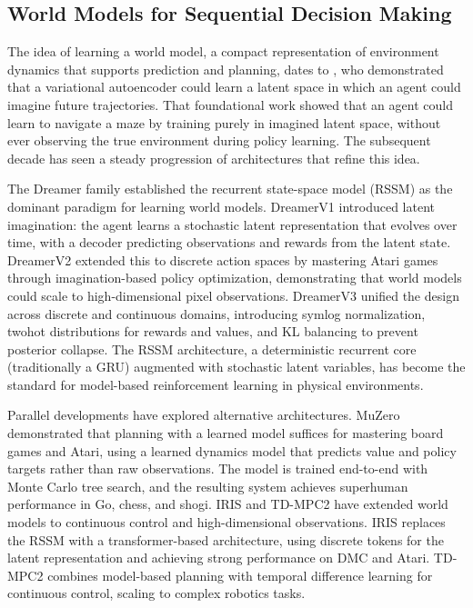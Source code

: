 \subsection{World Models for Sequential Decision Making}

The idea of learning a world model, a compact representation of environment dynamics that supports prediction and planning, dates to \citet{ha2018worldmodels}, who demonstrated that a variational autoencoder could learn a latent space in which an agent could imagine future trajectories. That foundational work showed that an agent could learn to navigate a maze by training purely in imagined latent space, without ever observing the true environment during policy learning. The subsequent decade has seen a steady progression of architectures that refine this idea.

The Dreamer family \citep{hafner2020dreamerv1, hafner2021dreamerv2, hafner2023dreamerv3} established the recurrent state-space model (RSSM) as the dominant paradigm for learning world models. DreamerV1 \citep{hafner2020dreamerv1} introduced latent imagination: the agent learns a stochastic latent representation that evolves over time, with a decoder predicting observations and rewards from the latent state. DreamerV2 \citep{hafner2021dreamerv2} extended this to discrete action spaces by mastering Atari games through imagination-based policy optimization, demonstrating that world models could scale to high-dimensional pixel observations. DreamerV3 \citep{hafner2023dreamerv3} unified the design across discrete and continuous domains, introducing symlog normalization, twohot distributions for rewards and values, and KL balancing to prevent posterior collapse. The RSSM architecture, a deterministic recurrent core (traditionally a GRU) augmented with stochastic latent variables, has become the standard for model-based reinforcement learning in physical environments.

Parallel developments have explored alternative architectures. MuZero \citep{schrittwieser2020muzero} demonstrated that planning with a learned model suffices for mastering board games and Atari, using a learned dynamics model that predicts value and policy targets rather than raw observations. The model is trained end-to-end with Monte Carlo tree search, and the resulting system achieves superhuman performance in Go, chess, and shogi. IRIS \citep{micheli2023iris} and TD-MPC2 \citep{hansen2024tdmpc2} have extended world models to continuous control and high-dimensional observations. IRIS replaces the RSSM with a transformer-based architecture, using discrete tokens for the latent representation and achieving strong performance on DMC and Atari. TD-MPC2 combines model-based planning with temporal difference learning for continuous control, scaling to complex robotics tasks.


